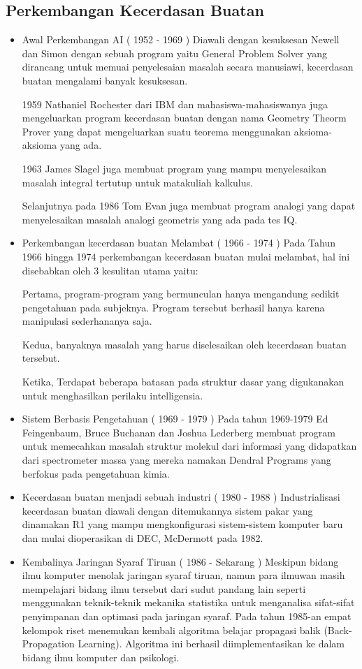 \documentclass{article}
\begin{document}
\subsection{Perkembangan Kecerdasan Buatan}
\begin{itemize}
\item{Awal Perkembangan AI ( 1952 - 1969 )}
Diawali dengan kesuksesan Newell dan Simon dengan sebuah program yaitu General Problem Solver yang dirancang untuk memuai penyelesaian masalah secara manusiawi, kecerdasan buatan mengalami banyak kesuksesan.

1959 Nathaniel Rochester dari IBM dan mahasiswa-mahasiswanya juga mengeluarkan program kecerdasan buatan dengan nama Geometry Theorm Prover yang dapat mengeluarkan suatu teorema menggunakan aksioma-aksioma yang ada.

1963 James Slagel juga membuat program yang mampu menyelesaikan masalah integral tertutup untuk matakuliah kalkulus.

Selanjutnya pada 1986 Tom Evan juga membuat program analogi yang dapat menyelesaikan masalah analogi geometris yang ada pada tes IQ.

\item{Perkembangan kecerdasan buatan Melambat ( 1966 - 1974 )}
Pada Tahun 1966 hingga 1974 perkembangan kecerdasan buatan mulai melambat, hal ini disebabkan oleh 3 kesulitan utama yaitu:

Pertama, program-program yang bermunculan hanya mengandung sedikit pengetahuan pada subjeknya. Program tersebut berhasil hanya karena manipulasi sederhananya saja.

Kedua, banyaknya masalah yang harus diselesaikan oleh kecerdasan buatan tersebut.

Ketika, Terdapat beberapa batasan pada struktur dasar yang digukanakan untuk menghasilkan perilaku intelligensia.

\item{Sistem Berbasis Pengetahuan ( 1969 - 1979 )}
Pada tahun 1969-1979 Ed Feingenbaum, Bruce Buchanan dan Joshua Lederberg membuat program untuk memecahkan masalah struktur molekul dari informasi yang didapatkan dari spectrometer massa yang mereka namakan Dendral Programs yang berfokus pada pengetahuan kimia. 

\item{Kecerdasan buatan menjadi sebuah industri ( 1980 - 1988 )}
Industrialisasi kecerdasan buatan diawali dengan ditemukannya sistem pakar yang dinamakan R1 yang mampu mengkonfigurasi sistem-sistem komputer baru dan mulai dioperasikan di DEC, McDermott pada 1982.

\item{Kembalinya Jaringan Syaraf Tiruan ( 1986 - Sekarang )}
Meskipun bidang ilmu komputer menolak jaringan syaraf tiruan, namun para ilmuwan masih mempelajari bidang ilmu tersebut dari sudut pandang lain seperti menggunakan teknik-teknik mekanika statistika untuk menganalisa sifat-sifat penyimpanan dan optimasi pada jaringan syaraf.
Pada tahun 1985-an  empat kelompok riset menemukan kembali algoritma belajar propagasi balik (Back-Propagation Learning). Algoritma ini berhasil diimplementasikan ke dalam bidang ilmu komputer dan psikologi.
\end{itemize}
\end{document}

